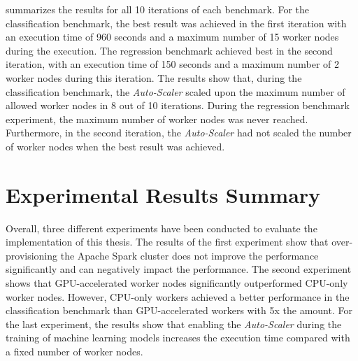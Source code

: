  summarizes the results for all 10 iterations of each benchmark.
For the classification benchmark, the best result was achieved in the first iteration with an execution time of 960 seconds and a maximum number of 15 worker nodes during the execution.
The regression benchmark achieved best in the second iteration, with an execution time of 150 seconds and a maximum number of 2 worker nodes during this iteration.
The results show that, during the classification benchmark, the \textit{Auto-Scaler} scaled upon the maximum number of allowed worker nodes in 8 out of 10 iterations. During the regression benchmark experiment, the maximum number of worker nodes was never reached. Furthermore, in the second iteration, the \textit{Auto-Scaler} had not scaled the number of worker nodes when the best result was achieved.


\section{Experimental Results Summary}
Overall, three different experiments have been conducted to evaluate the implementation of this thesis.
The results of the first experiment show that over-provisioning the Apache Spark cluster does not improve the performance significantly and can negatively impact the performance. 
The second experiment shows that GPU-accelerated worker nodes significantly outperformed CPU-only worker nodes. However, CPU-only workers achieved a better performance in the classification benchmark than GPU-accelerated workers with 5x the amount.
For the last experiment, the results show that enabling the \textit{Auto-Scaler} during the training of machine learning models increases the execution time compared with a fixed number of worker nodes.
